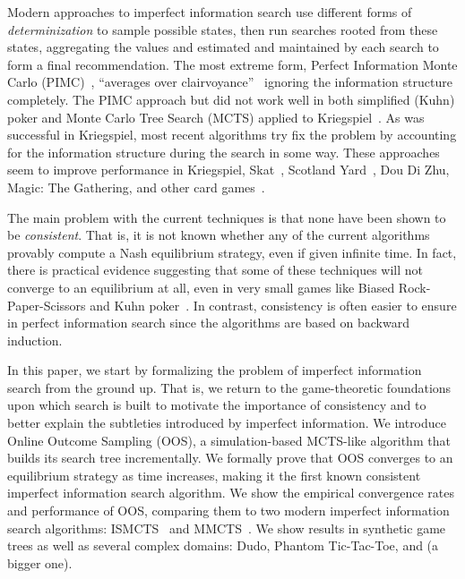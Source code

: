 \documentclass[letterpaper]{article}
\begin{document}
Modern approaches to imperfect information search use different forms of {\it determinization} to sample possible states, then run 
searches rooted from these states, aggregating the values and estimated and maintained by each search to form a final recommendation. 
The most extreme form, Perfect Information Monte Carlo (PIMC)~\cite{Long10Understanding}, ``averages over clairvoyance''~\cite{AIBook}
ignoring the information structure completely. The PIMC approach but did not work well in both simplified (Kuhn) poker and 
Monte Carlo Tree Search (MCTS) applied to Kriegspiel~\cite{Ciancarini10Kriegspiel}. 
As was successful in Kriegspiel, most recent algorithms try fix the problem by accounting for the information structure during the 
search in some way. These approaches seem to improve performance in Kriegspiel, Skat~\cite{Furtak13Recursive}, 
Scotland Yard~\cite{Nijssen12SY}, Dou Di Zhu, Magic: The Gathering, and other card games~\cite{Cowling12MTG,Cowling12ISMCTS}.


The main problem with the current techniques is that none have been shown to be {\it consistent}. 
That is, it is not known whether any of the current algorithms provably compute a Nash equilibrium strategy, even if given 
infinite time. In fact, there is practical evidence suggesting that some of these techniques will not converge to an 
equilibrium at all, even in very small games like Biased Rock-Paper-Scissors and Kuhn poker~\cite{Shafiei09,Ponsen11Computing}.
In contrast, consistency is often easier to ensure in perfect information search since the algorithms are based on backward induction. 

In this paper, we start by formalizing the problem of imperfect information search from the ground up. That is, we return to the game-theoretic 
foundations upon which search is built to motivate the importance of consistency and to better explain the subtleties introduced by imperfect 
information. 
We introduce Online Outcome Sampling (OOS), a simulation-based MCTS-like algorithm that builds its search tree incrementally. 
We formally prove that OOS converges to an equilibrium strategy as time increases, making it the first 
known consistent imperfect information search algorithm.
We show the empirical convergence rates and performance of OOS, comparing them to two modern imperfect information search algorithms: 
ISMCTS~\cite{Cowling12ISMCTS} and MMCTS~\cite{Auger11Multiple}.
We show results in synthetic game trees as well as several complex domains: Dudo, Phantom Tic-Tac-Toe, 
and (a bigger one). 
\end{document}

